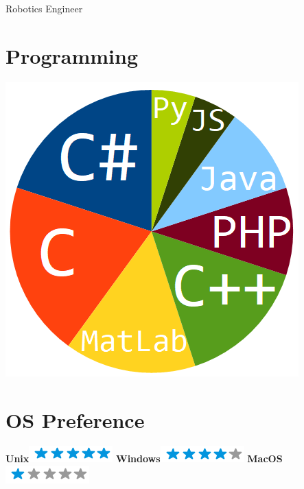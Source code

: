 \documentclass[]{friggeri-cv}
\begin{document}
      {Robotics Engineer}
      

\begin{aside}
  \section{Programming}
    \includegraphics[scale=0.3]{img/progskilz.png}
    ~
  \section{OS Preference}
    \textbf{Unix}\includegraphics[scale=0.40]{img/5stars.png}
    \textbf{Windows}\includegraphics[scale=0.40]{img/4stars.png}
    \textbf{MacOS}\includegraphics[scale=0.40]{img/1stars.png}
    ~

\end{aside}
\end{document}
